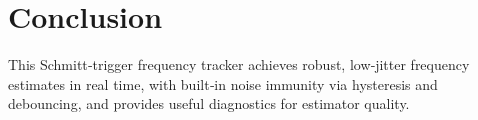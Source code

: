 \documentclass[12pt,letterpaper]{article}
\begin{document}
\section{Conclusion}
This Schmitt‐trigger frequency tracker achieves robust, low‐jitter frequency estimates in real time, with built‐in noise immunity via hysteresis and debouncing, and provides useful diagnostics for estimator quality.
\end{document}

